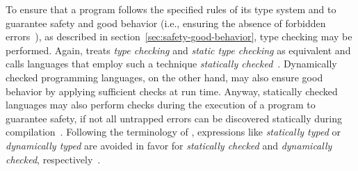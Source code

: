 To ensure that a program follows the specified rules of its type system and to guarantee safety and good behavior (i.e., ensuring the absence of forbidden errors~\cite[p.~37]{TypeSystems:Cardelli:2004}), as described in section~\ref{sec:safety-good-behavior}, type checking may be performed. Again, \citeauthor{TypeSystems:Cardelli:2004} treats \emph{type checking} and \emph{static type checking} as equivalent and calls languages that employ such a technique \emph{statically checked}~\cite[p.~3]{TypeSystems:Cardelli:2004}. Dynamically checked programming languages, on the other hand, may also ensure good behavior by applying sufficient checks at run time. Anyway, statically checked languages may also perform checks during the execution of a program to guarantee safety, if not all untrapped errors can be discovered statically during compilation~\cite[p.~4]{TypeSystems:Cardelli:2004}. Following the terminology of \citeauthor{TypeSystems:Cardelli:2004}, expressions like \emph{statically typed} or \emph{dynamically typed} are avoided in favor for \emph{statically checked} and \emph{dynamically checked}, respectively~\cite[p.~1]{TypeSystems:Cardelli:2004}.

%







